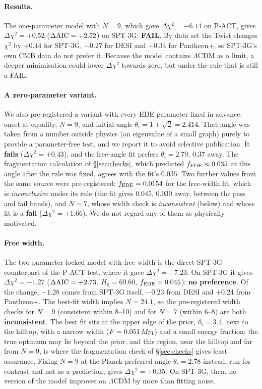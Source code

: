 \documentclass[11pt]{article}
\newcommand{\Mp}{M_{\rm Pl}}
\newcommand{\SPTfreeDchi}{\ensuremath{-1.27}}   %
\newcommand{\SPTfreeHz}{\ensuremath{69.60}}     %
\newcommand{\SPTfreeF}{\ensuremath{0.045}}      %
\newcommand{\SPTfreeN}{\ensuremath{24.1}}       %
\newcommand{\SPTsevenDchi}{\ensuremath{+1.66}}  %
\newcommand{\SPTsevenVerdict}{a \textbf{fail} ($\Delta\chi^2=\SPTsevenDchi$)}
\begin{document}
\paragraph{Results.} The one-parameter model with $N=9$, which gave $\Delta\chi^2=-6.14$ on P-ACT,
gives $\Delta\chi^2=+0.52$ ($\Delta{\rm AIC}=+2.52$) on SPT-3G: \textbf{FAIL}. By data set the Twist
changes $\chi^2$ by $+0.44$ for SPT-3G, $-0.27$ for DESI and $+0.34$ for Pantheon+, so SPT-3G's own CMB
data do not prefer it. Because the model contains $\Lambda$CDM as a limit, a deeper minimisation could
lower $\Delta\chi^2$ towards zero, but under the rule that is still a FAIL.

\paragraph{A zero-parameter variant.} We also pre-registered a variant with every EDE parameter fixed in
advance: onset at equality, $N=9$, and initial angle $\theta_i=1+\sqrt2=2.414$. That angle was taken
from a number outside physics (an eigenvalue of a small graph) purely to provide a parameter-free test,
and we report it to avoid selective publication. It \textbf{fails} ($\Delta\chi^2=+0.43$), and the
free-angle fit prefers $\theta_i=2.79$, $0.37$ away. The fragmentation calculation of
\S\ref{sec:checks}, which predicted $f_{\rm EDE}\approx0.035$ at this angle after the rule was fixed,
agrees with the fit's $0.035$. Two further values from the same source were pre-registered: $f_{\rm EDE}=0.0154$
for the free-width fit, which is \emph{inconclusive} under its rule (the fit gives $0.045$, $0.030$ away, between
the pass and fail bands), and $N=7$, whose width check is \emph{inconsistent} (below) and whose fit is
\SPTsevenVerdict. We do not regard any of them as physically motivated.

\paragraph{Free width.} The two-parameter locked model with free width is the direct SPT-3G counterpart
of the P-ACT test, where it gave $\Delta\chi^2=-7.23$. On SPT-3G it gives $\Delta\chi^2=\SPTfreeDchi$
($\Delta{\rm AIC}=+2.73$, $H_0=\SPTfreeHz$, $f_{\rm EDE}=\SPTfreeF$): \textbf{no preference}. Of the change,
$-1.28$ comes from SPT-3G itself, $-0.23$ from DESI and $+0.24$ from Pantheon+. The best-fit width implies
$N=\SPTfreeN$, so the pre-registered width checks for $N=9$ (consistent within 8--10) and for $N=7$
(within 6--8) are both \textbf{inconsistent}. The best fit sits at the upper edge of the prior,
$\theta_i=3.1$, next to the hilltop, with a narrow width ($F=0.051\,\Mp$) and a small energy fraction; the
true optimum may lie beyond the prior, and this region, near the hilltop and far from $N=9$, is where the
fragmentation check of \S\ref{sec:checks} gives least assurance. Fixing $N=9$ at the Planck-preferred angle
$\theta_i=2.78$ instead, run for contrast and not as a prediction, gives $\Delta\chi^2=+0.35$. On SPT-3G, then,
no version of the model improves on $\Lambda$CDM by more than fitting noise.
\end{document}
